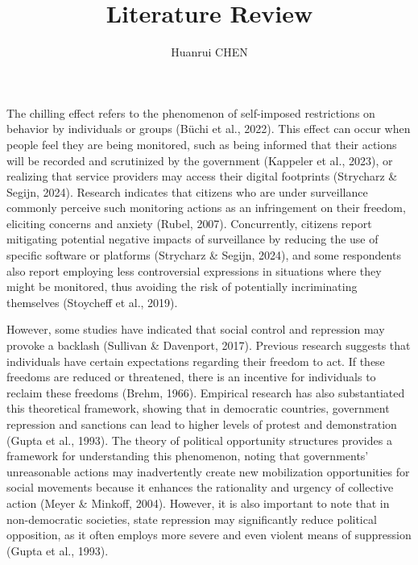 \documentclass[12pt]{article}
\title{Literature Review}
\author{Huanrui CHEN}
\begin{document}
\maketitle

The chilling effect refers to the phenomenon of self-imposed restrictions on behavior by individuals or groups (Büchi et al., 2022). This effect can occur when people feel they are being monitored, such as being informed that their actions will be recorded and scrutinized by the government (Kappeler et al., 2023), or realizing that service providers may access their digital footprints (Strycharz \& Segijn, 2024). Research indicates that citizens who are under surveillance commonly perceive such monitoring actions as an infringement on their freedom, eliciting concerns and anxiety (Rubel, 2007). Concurrently, citizens report mitigating potential negative impacts of surveillance by reducing the use of specific software or platforms (Strycharz \& Segijn, 2024), and some respondents also report employing less controversial expressions in situations where they might be monitored, thus avoiding the risk of potentially incriminating themselves (Stoycheff et al., 2019).

However, some studies have indicated that social control and repression may provoke a backlash (Sullivan \& Davenport, 2017). Previous research suggests that individuals have certain expectations regarding their freedom to act. If these freedoms are reduced or threatened, there is an incentive for individuals to reclaim these freedoms (Brehm, 1966). Empirical research has also substantiated this theoretical framework, showing that in democratic countries, government repression and sanctions can lead to higher levels of protest and demonstration (Gupta et al., 1993). The theory of political opportunity structures provides a framework for understanding this phenomenon, noting that governments' unreasonable actions may inadvertently create new mobilization opportunities for social movements because it enhances the rationality and urgency of collective action (Meyer \& Minkoff, 2004). However, it is also important to note that in non-democratic societies, state repression may significantly reduce political opposition, as it often employs more severe and even violent means of suppression (Gupta et al., 1993).
\end{document}
